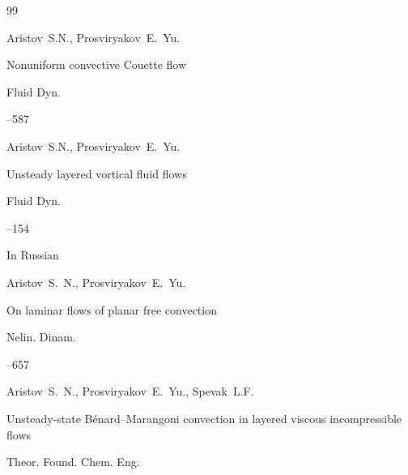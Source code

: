 \begin{thebibliography}{99}






\by Aristov~S.N., Prosviryakov~E.~Yu.

\paper Nonuniform convective Couette flow

\jour Fluid Dyn.




--587





\by Aristov~S.N., Prosviryakov~E.~Yu.

\paper Unsteady layered vortical fluid flows

\jour Fluid Dyn.




--154








\lang In Russian

\by Aristov~S.~N., Prosviryakov~E.~Yu.

\paper On laminar flows of planar free convection

\jour Nelin. Dinam.




--657







\by Aristov~S.~N., Prosviryakov~E.~Yu., Spevak~L.F.

\paper Unsteady-state B\'enard–Marangoni convection in layered viscous incompressible flows

\jour  Theor. Found. Chem. Eng.



\end{thebibliography}
